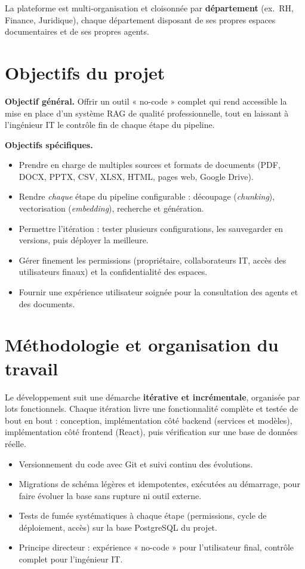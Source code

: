 \documentclass[11pt,a4paper]{article}
\begin{document}
La plateforme est multi-organisation et cloisonnée par \textbf{département}
(ex.\ RH, Finance, Juridique), chaque département disposant de ses propres
espaces documentaires et de ses propres agents.

\section{Objectifs du projet}

\textbf{Objectif général.} Offrir un outil « no-code » complet qui rend
accessible la mise en place d'un système RAG de qualité professionnelle, tout en
laissant à l'ingénieur IT le contrôle fin de chaque étape du pipeline.

\smallskip
\textbf{Objectifs spécifiques.}
\begin{itemize}
  \item Prendre en charge de multiples sources et formats de documents
        (PDF, DOCX, PPTX, CSV, XLSX, HTML, pages web, Google Drive).
  \item Rendre \emph{chaque} étape du pipeline configurable : découpage
        (\emph{chunking}), vectorisation (\emph{embedding}), recherche et
        génération.
  \item Permettre l'itération : tester plusieurs configurations, les
        sauvegarder en versions, puis déployer la meilleure.
  \item Gérer finement les permissions (propriétaire, collaborateurs IT, accès
        des utilisateurs finaux) et la confidentialité des espaces.
  \item Fournir une expérience utilisateur soignée pour la consultation des
        agents et des documents.
\end{itemize}

\section{Méthodologie et organisation du travail}

Le développement suit une démarche \textbf{itérative et incrémentale}, organisée
par lots fonctionnels. Chaque itération livre une fonctionnalité complète et
testée de bout en bout : conception, implémentation côté backend (services et
modèles), implémentation côté frontend (React), puis vérification sur une base de
données réelle.

\begin{itemize}
  \item Versionnement du code avec Git et suivi continu des évolutions.
  \item Migrations de schéma légères et idempotentes, exécutées au démarrage,
        pour faire évoluer la base sans rupture ni outil externe.
  \item Tests de fumée systématiques à chaque étape (permissions, cycle de
        déploiement, accès) sur la base PostgreSQL du projet.
  \item Principe directeur : expérience « no-code » pour l'utilisateur final,
        contrôle complet pour l'ingénieur IT.
\end{itemize}
\end{document}
